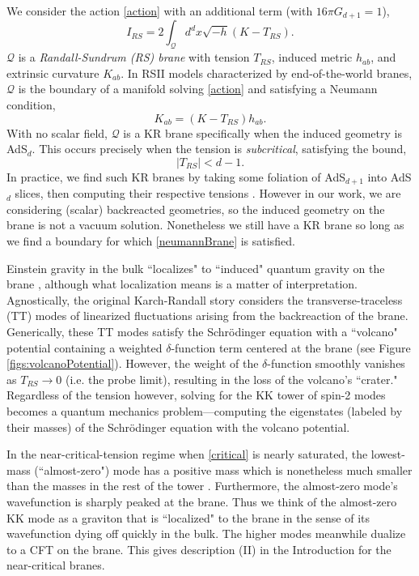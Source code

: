 \documentclass[12pt,a4paper]{article}
\begin{document}
We consider the action \eqref{action} with an additional term (with $16\pi G_{d+1} = 1$),
\begin{equation}
I_{RS} = 2\int_{\mathcal{Q}} d^dx \sqrt{-h}(K-T_{RS}).
\end{equation}
$\mathcal{Q}$ is a \textit{Randall-Sundrum (RS) brane} with tension $T_{RS}$, induced metric $h_{ab}$, and extrinsic curvature $K_{ab}$. In RSII models characterized by end-of-the-world branes, $\mathcal{Q}$ is the boundary of a manifold solving \eqref{action} and satisfying a Neumann condition,
\begin{equation}
K_{ab} = (K-T_{RS})h_{ab}.\label{neumannBrane}
\end{equation}
With no scalar field, $\mathcal{Q}$ is a KR brane specifically when the induced geometry is AdS$_d$. This occurs precisely when the tension is \textit{subcritical}, satisfying the bound,
\begin{equation}
|T_{RS}| < d-1.\label{critical}
\end{equation}
In practice, we find such KR branes by taking some foliation of AdS$_{d+1}$ into AdS$_d$ slices, then computing their respective tensions \cite{Aharony:2003qf}. However in our work, we are considering (scalar) backreacted geometries, so the induced geometry on the brane is not a vacuum solution. Nonetheless we still have a KR brane so long as we find a boundary for which \eqref{neumannBrane} is satisfied.
\FloatBarrier

Einstein gravity in the bulk ``localizes" to ``induced" quantum gravity on the brane \cite{Karch:2000ct,Karch:2000gx,Chen:2020uac}, although what localization means is a matter of interpretation. Agnostically, the original Karch-Randall story \cite{Karch:2000ct} considers the transverse-traceless (TT) modes of linearized fluctuations arising from the backreaction of the brane. Generically, these TT modes satisfy the Schr\"odinger equation with a ``volcano" potential containing a weighted $\delta$-function term centered at the brane (see Figure \ref{figs:volcanoPotential}). However, the weight of the $\delta$-function smoothly vanishes as $T_{RS} \to 0$ (i.e. the probe limit), resulting in the loss of the volcano's ``crater." Regardless of the tension however, solving for the KK tower of spin-2 modes becomes a quantum mechanics problem---computing the eigenstates (labeled by their masses) of the Schr\"odinger equation with the volcano potential.

In the near-critical-tension regime when \eqref{critical} is nearly saturated, the lowest-mass (``almost-zero") mode has a positive mass which is nonetheless much smaller than the masses in the rest of the tower \cite{Karch:2000ct,Miemiec:2000eq,Schwartz:2000ip}. Furthermore, the almost-zero mode's wavefunction is sharply peaked at the brane. Thus we think of the almost-zero KK mode as a graviton that is ``localized" to the brane in the sense of its wavefunction dying off quickly in the bulk. The higher modes meanwhile dualize to a CFT on the brane. This gives description (II) in the Introduction for the near-critical branes.
\end{document}
